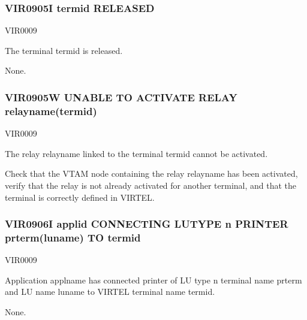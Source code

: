 \documentclass[letterpaper,10pt,english]{sphinxmanual}
\begin{document}
\subsubsection{VIR0905I termid RELEASED}
\label{\detokenize{messages:vir0905i-termid-released}}\begin{description}
\sphinxAtStartPar
VIR0009

\sphinxAtStartPar
The terminal termid is released.

\sphinxAtStartPar
None.

\end{description}


\subsubsection{VIR0905W UNABLE TO ACTIVATE RELAY relayname(termid)}
\label{\detokenize{messages:vir0905w-unable-to-activate-relay-relayname-termid}}\begin{description}
\sphinxAtStartPar
VIR0009

\sphinxAtStartPar
The relay relayname linked to the terminal termid cannot be activated.

\sphinxAtStartPar
Check that the VTAM node containing the relay relayname has been activated, verify that the relay is not already activated for another terminal, and that the terminal is correctly defined in VIRTEL.

\end{description}


\subsubsection{VIR0906I applid CONNECTING LUTYPE n PRINTER prterm(luname) TO termid}
\label{\detokenize{messages:vir0906i-applid-connecting-lutype-n-printer-prterm-luname-to-termid}}\begin{description}
\sphinxAtStartPar
VIR0009

\sphinxAtStartPar
Application applname has connected printer of LU type n terminal name prterm and LU name luname to VIRTEL terminal name termid.

\sphinxAtStartPar
None.

\end{description}
\end{document}
